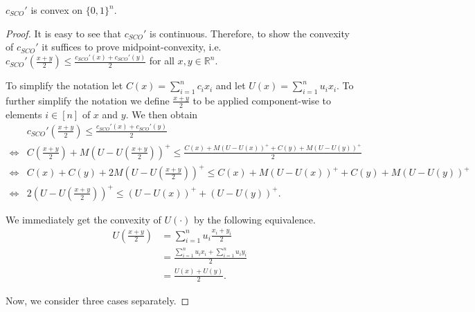 \begin{lemma}
\label{lemma:integer_minimization_convexity}
$c_{SCO}'$ is convex on $\{0,1\}^n$.
\end{lemma}
\begin{proof}
It is easy to see that $c_{SCO}'$ is continuous. Therefore, to show the convexity of $c_{SCO}'$ it suffices to prove midpoint-convexity, i.e. $c_{SCO}'\left(\frac{x+y}{2}\right) \leq \frac{c_{SCO}'(x)+c_{SCO}'(y)}{2}$ for all $x, y \in \mathbb{R}^n$.

To simplify the notation let $C(x) = \sum_{i=1}^n c_i x_i$ and let $U(x) = \sum_{i=1}^n u_i x_i$. To further simplify the notation we define $\frac{x+y}{2}$ to be applied component-wise to elements $i \in [n]$ of $x$ and $y$. We then obtain \small{
\begin{align*}
         &c_{SCO}'\left(\frac{x+y}{2}\right) \leq \frac{c_{SCO}'(x)+c_{SCO}'(y)}{2} \\
    \iff &C\left(\frac{x+y}{2}\right) + M\left(U - U\left(\frac{x+y}{2}\right)\right)^+ \leq \frac{C(x) + M(U - U(x))^+ + C(y) + M(U - U(y))^+}{2} \\
    \iff &C(x) + C(y) + 2M\left(U - U\left(\frac{x+y}{2}\right)\right)^+ \leq C(x) + M(U - U(x))^+ + C(y) + M(U - U(y))^+ \\
    \iff &2\left(U - U\left(\frac{x+y}{2}\right)\right)^+ \leq (U - U(x))^+ + (U - U(y))^+.
\end{align*}
}\normalsize

We immediately get the convexity of $U(\cdot)$ by the following equivalence. \begin{align*}
    U\left(\frac{x+y}{2}\right) &= \sum_{i=1}^n u_i \frac{x_i + y_i}{2} \\
                                &= \frac{\sum_{i=1}^n u_i x_i + \sum_{i=1}^n u_i y_i}{2} \\
                                &= \frac{U(x) + U(y)}{2}.
\end{align*}

Now, we consider three cases separately.


\end{proof}
